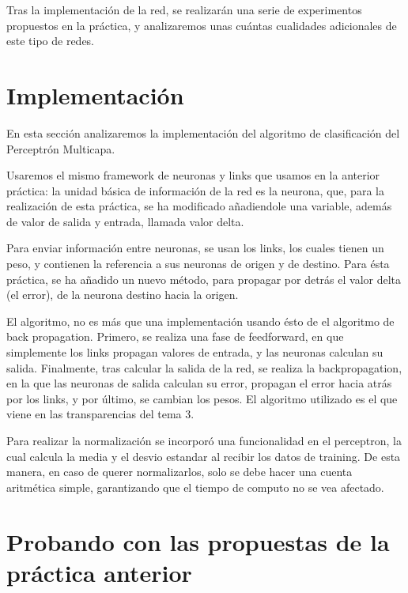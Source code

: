 \documentclass[12pt]{article}
\begin{document}
Tras la implementación de la red, se realizarán una serie de experimentos propuestos en la práctica, y analizaremos unas cuántas cualidades adicionales de este tipo de redes.

\newpage
\section{Implementación}

En esta sección analizaremos la implementación del algoritmo de clasificación del Perceptrón Multicapa.

Usaremos el mismo framework de neuronas y links que usamos en la anterior práctica: la unidad básica de información de la red es la neurona, que, para la realización de esta práctica, se ha modificado añadiendole una variable, además de valor de salida y entrada, llamada valor delta.

Para enviar información entre neuronas, se usan los links, los cuales tienen un peso, y contienen la referencia a sus neuronas de origen y de destino. Para ésta práctica, se ha añadido un nuevo método, para propagar por detrás el valor delta (el error), de la neurona destino hacia la origen.

El algoritmo, no es más que una implementación usando ésto de el algoritmo de back propagation. Primero, se realiza una fase de feedforward, en que simplemente los links propagan valores de entrada, y las neuronas calculan su salida. Finalmente, tras calcular la salida de la red, se realiza la backpropagation, en la que las neuronas de salida calculan su error, propagan el error hacia atrás por los links, y por último, se cambian los pesos. El algoritmo utilizado es el que viene en las transparencias del tema 3.


Para realizar la normalización se incorporó una funcionalidad en el perceptron, la cual calcula la media y el desvio estandar al recibir los datos de training. De esta manera, en caso de querer normalizarlos, solo se debe hacer una cuenta aritmética simple, garantizando que el tiempo de computo no se vea afectado.

\newpage

\section{Probando con las propuestas de la pr\'actica anterior}
\end{document}
